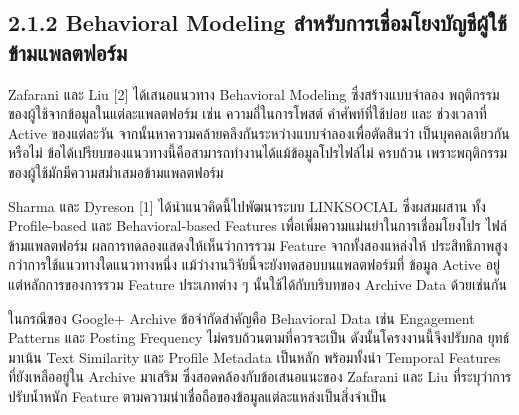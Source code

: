 \documentclass[12pt,a4paper]{report}
\begin{document}
\subsection*{2.1.2 Behavioral Modeling สำหรับการเชื่อมโยงบัญชีผู้ใช้ข้ามแพลตฟอร์ม}
Zafarani และ Liu [2] ได้เสนอแนวทาง Behavioral Modeling ซึ่งสร้างแบบจำลอง พฤติกรรมของผู้ใช้จากข้อมูลในแต่ละแพลตฟอร์ม เช่น ความถี่ในการโพสต์ คำศัพท์ที่ใช้บ่อย และ ช่วงเวลาที่ Active ของแต่ละวัน จากนั้นหาความคล้ายคลึงกันระหว่างแบบจำลองเพื่อตัดสินว่า เป็นบุคคลเดียวกันหรือไม่ ข้อได้เปรียบของแนวทางนี้คือสามารถทำงานได้แม้ข้อมูลโปรไฟล์ไม่ ครบถ้วน เพราะพฤติกรรมของผู้ใช้มักมีความสม่ำเสมอข้ามแพลตฟอร์ม\par
\clearpage
Sharma และ Dyreson [1] ได้นำแนวคิดนี้ไปพัฒนาระบบ LINKSOCIAL ซึ่งผสมผสาน ทั้ง Profile-based และ Behavioral-based Features เพื่อเพิ่มความแม่นยำในการเชื่อมโยงโปร ไฟล์ข้ามแพลตฟอร์ม ผลการทดลองแสดงให้เห็นว่าการรวม Feature จากทั้งสองแหล่งให้ ประสิทธิภาพสูงกว่าการใช้แนวทางใดแนวทางหนึ่ง แม้ว่างานวิจัยนี้จะยังทดสอบบนแพลตฟอร์มที่ ข้อมูล Active อยู่ แต่หลักการของการรวม Feature ประเภทต่าง ๆ นั้นใช้ได้กับบริบทของ Archive Data ด้วยเช่นกัน\par
ในกรณีของ Google+ Archive ข้อจำกัดสำคัญคือ Behavioral Data เช่น Engagement Patterns และ Posting Frequency ไม่ครบถ้วนตามที่ควรจะเป็น ดังนั้นโครงงานนี้จึงปรับกล ยุทธ์มาเน้น Text Similarity และ Profile Metadata เป็นหลัก พร้อมทั้งนำ Temporal Features ที่ยังเหลืออยู่ใน Archive มาเสริม ซึ่งสอดคล้องกับข้อเสนอแนะของ Zafarani และ Liu ที่ระบุว่าการปรับน้ำหนัก Feature ตามความน่าเชื่อถือของข้อมูลแต่ละแหล่งเป็นสิ่งจำเป็น\par
\end{document}
